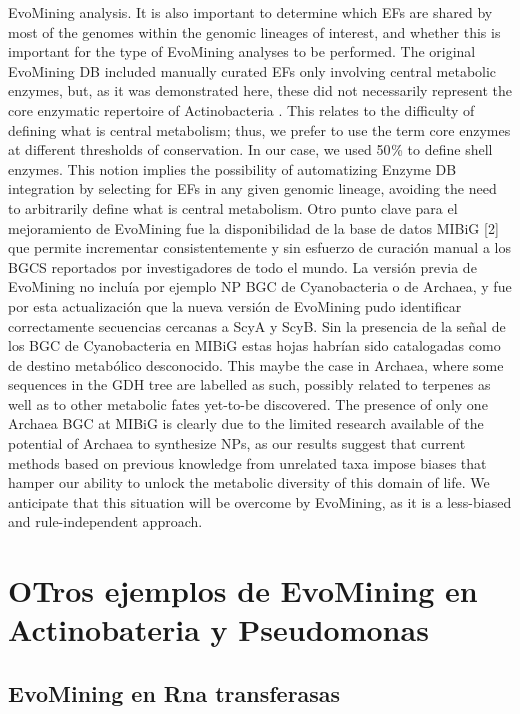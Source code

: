 \documentclass[12pt,twoside]{reedthesis}
\begin{document}
  EvoMining analysis. It is also important to determine which EFs are
  shared by most of the genomes within the genomic lineages of interest,
  and whether this is important for the type of EvoMining analyses to be
  performed. The original EvoMining DB included manually curated EFs only
  involving central metabolic enzymes, but, as it was demonstrated here,
  these did not necessarily represent the core enzymatic repertoire of
  Actinobacteria . This relates to the difficulty of defining what is
  central metabolism; thus, we prefer to use the term core enzymes at
  different thresholds of conservation. In our case, we used 50 \% to
  define shell enzymes. This notion implies the possibility of
  automatizing Enzyme DB integration by selecting for EFs in any given
  genomic lineage, avoiding the need to arbitrarily define what is central
  metabolism. Otro punto clave para el mejoramiento de EvoMining fue la
  disponibilidad de la base de datos MIBiG {[}2{]} que permite incrementar
  consistentemente y sin esfuerzo de curación manual a los BGCS reportados
  por investigadores de todo el mundo. La versión previa de EvoMining no
  incluía por ejemplo NP BGC de Cyanobacteria o de Archaea, y fue por esta
  actualización que la nueva versión de EvoMining pudo identificar
  correctamente secuencias cercanas a ScyA y ScyB. Sin la presencia de la
  señal de los BGC de Cyanobacteria en MIBiG estas hojas habrían sido
  catalogadas como de destino metabólico desconocido. This maybe the case
  in Archaea, where some sequences in the GDH tree are labelled as such,
  possibly related to terpenes as well as to other metabolic fates
  yet-to-be discovered. The presence of only one Archaea BGC at MIBiG is
  clearly due to the limited research available of the potential of
  Archaea to synthesize NPs, as our results suggest that current methods
  based on previous knowledge from unrelated taxa impose biases that
  hamper our ability to unlock the metabolic diversity of this domain of
  life. We anticipate that this situation will be overcome by EvoMining,
  as it is a less-biased and rule-independent approach.
  
  \section{OTros ejemplos de EvoMining en Actinobateria y
  Pseudomonas}\label{otros-ejemplos-de-evomining-en-actinobateria-y-pseudomonas}
  
  \subsection{EvoMining en Rna
  transferasas}\label{evomining-en-rna-transferasas}
  
\end{document}
